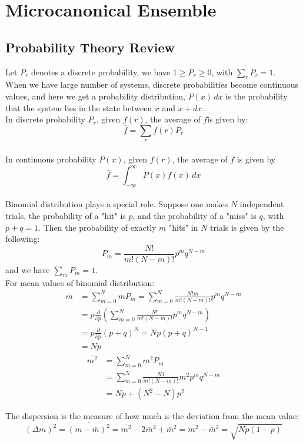 \documentclass[11pt,oneside]{book}
\theoremstyle{break}
\theoremstyle{break}
\begin{document}
\newpage
\setcounter{chapter}{0}
\chapter{Microcanonical Ensemble}
\section[Probability Theory Review]{\color{red}Probability Theory Review\color{black}}
Let $P_r$ denotes a discrete probability, we have $1\geq P_r \geq 0$, with $\sum_r P_r = 1$.\\

When we have large number of systems, discrete probabilities become continuous values, and here we get a probability distribution, $P(x)\, dx$ is the probability that the system lies in the state between $x$ and $x+ dx$. \\


In discrete probability $P_r$, given $f(r)$, the average of $f$is given by: $$\bar{f} = \sum_r f(r) P_r$$\\
In continuous probability $P(x)$, given $f(r)$, the average of $f$ is given by $$\bar{f} = \int_{-\infty}^\infty P(x) f(x)\, dx$$ \\

Binomial distribution plays a special role. Suppose one makes $N$ independent trials, the probability of a "hit" is $p$, and the probability of a "miss" is $q$, with $p+q = 1$. Then the probability of exactly $m$ "hits" in $N$ trials is given by the following:
$$P_m = \frac{N!}{m!(N-m)!}p^m q^{N-m}$$
and we have $\sum_m P_m = 1$.\\


For mean values of binomial distribution:
\begin{align*}
\bar m &= \sum_{m=0}^N mP_m = \sum_{m=0}^N \frac{N! m}{m!(N-m)!}p^mq^{N-m} \\
&= p\frac{\partial }{\partial p} \left(\sum_{m=0}^N \frac{N!}{m!(N-m)!}p^m q^{N-m} \right)\\ 
&= p\frac{\partial}{\partial p}(p+q)^N = Np(p+q)^{N-1}\\
&= Np
\end{align*}
\begin{align*}
\overline{m^2} &= \sum_{m=0}^N m^2 P_m \\
&= \sum_{m=0}^N \frac{N1}{m!(N-m)!}m^2p^mq^{N-m}\\
&= Np+(N^2-N)p^2
\end{align*}

The dispersion is the measure of how much is the deviation from the mean value:
$$(\Delta m)^2 = \overline{(m-\bar{m})^2} = \overline{m^2} - 2\bar{m}^2 + \bar{m}^2 = \overline{m^2} - \bar{m}^2 = \sqrt{Np(1-p)}$$
\end{document}
